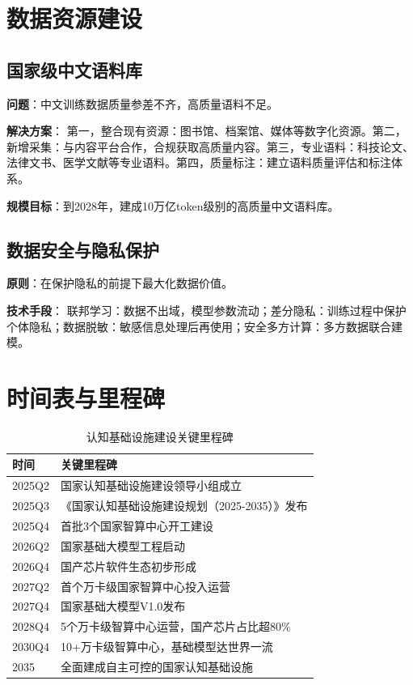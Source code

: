 \section{数据资源建设}

\subsection{国家级中文语料库}

\textbf{问题}：中文训练数据质量参差不齐，高质量语料不足。

\textbf{解决方案}：
第一，整合现有资源：图书馆、档案馆、媒体等数字化资源。第二，新增采集：与内容平台合作，合规获取高质量内容。第三，专业语料：科技论文、法律文书、医学文献等专业语料。第四，质量标注：建立语料质量评估和标注体系。

\textbf{规模目标}：到2028年，建成10万亿token级别的高质量中文语料库。

\subsection{数据安全与隐私保护}

\textbf{原则}：在保护隐私的前提下最大化数据价值。

\textbf{技术手段}：
联邦学习：数据不出域，模型参数流动；差分隐私：训练过程中保护个体隐私；数据脱敏：敏感信息处理后再使用；安全多方计算：多方数据联合建模。

\section{时间表与里程碑}

\begin{table}[H]
\centering
\caption{认知基础设施建设关键里程碑}
\small
\begin{tabular}{p{2cm}p{10cm}}
\toprule
\textbf{时间} & \textbf{关键里程碑} \\
\midrule
2025Q2 & 国家认知基础设施建设领导小组成立 \\
2025Q3 & 《国家认知基础设施建设规划（2025-2035）》发布 \\
2025Q4 & 首批3个国家智算中心开工建设 \\
2026Q2 & 国家基础大模型工程启动 \\
2026Q4 & 国产芯片软件生态初步形成 \\
2027Q2 & 首个万卡级国家智算中心投入运营 \\
2027Q4 & 国家基础大模型V1.0发布 \\
2028Q4 & 5个万卡级智算中心运营，国产芯片占比超80\% \\
2030Q4 & 10+万卡级智算中心，基础模型达世界一流 \\
2035 & 全面建成自主可控的国家认知基础设施 \\
\bottomrule
\end{tabular}
\end{table}

